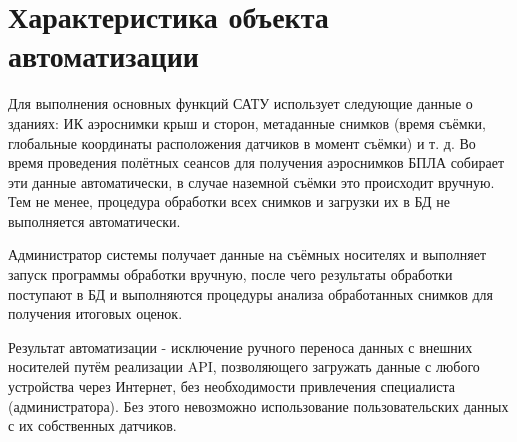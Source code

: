 \chapter{Характеристика объекта автоматизации}
	Для выполнения основных функций САТУ использует следующие данные о зданиях: ИК аэроснимки крыш и сторон, метаданные снимков (время съёмки, глобальные координаты расположения датчиков в момент съёмки) и т. д. Во время проведения полётных сеансов для получения аэроснимков БПЛА собирает эти данные автоматически, в случае наземной съёмки это происходит вручную. Тем не менее, процедура обработки всех снимков и загрузки их в БД не выполняется автоматически. 

	Администратор системы получает данные на съёмных носителях и выполняет запуск программы обработки вручную, после чего результаты обработки поступают в БД и выполняются процедуры анализа обработанных снимков для получения итоговых оценок.

	Результат автоматизации - исключение ручного переноса данных с внешних носителей путём реализации API, позволяющего загружать данные с любого устройства через Интернет, без необходимости привлечения специалиста (администратора). Без этого невозможно использование пользовательских данных с их собственных датчиков.

